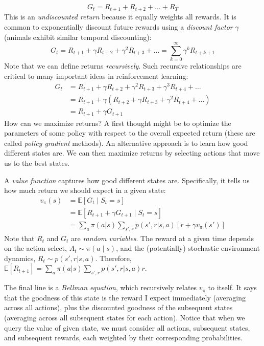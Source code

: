 $$ G_t = R_{t+1} + R_{t+2} + \dots + R_{T}$$
This is an \textit{undiscounted return} because it equally weights all rewards. It is common to exponentially discount future rewards using a \textit{discount factor} $\gamma$ (animals exhibit similar temporal discounting):
$$
G_t = R_{t+1} + \gamma R_{t+2} + \gamma^2R_{t+3} + \dots =
\sum_{k=0}^\infty \gamma^k R_{t+k+1}
$$
Note that we can define returns \textit{recursively}. Such recursive relationships are critical to many important ideas in reinforcement learning:
\begin{align*}
G_t &= R_{t+1} + \gamma R_{t+2} + \gamma^2R_{t+3} + \gamma^3R_{t+4} + \dots \\
&= R_{t+1} + \gamma(R_{t+2} + \gamma R_{t+3} + \gamma^2R_{t+4} +\dots) \\
&= R_{t+1} + \gamma G_{t+1}
\end{align*}
How can we maximize returns? A first thought might be to optimize the parameters of some policy with respect to the overall expected return (these are called \textit{policy gradient} methods). An alternative approach is to learn how good different states are. We can then maximize returns by selecting actions that move us to the best states.

A \textit{value function} captures how good different states are. Specifically, it tells us how much return we should expect in a given state:
\begin{align*}
v_\pi (s) &= \mathbb{E}[G_t \mid S_t=s] \\
&= \mathbb{E}[R_{t+1} + \gamma G_{t+1} \mid S_t=s] \\
&= \sum_a \pi (a|s) \sum_{s', r} p(s', r | s, a) [r + \gamma v_\pi (s')]
\end{align*}
Note that $R_t$ and $G_t$ are \textit{random variables}. The reward at a given time depends on the action select, $A_t \sim \pi (a \mid s)$, and the (potentially) stochastic environment dynamics, $R_t \sim p(s',r|s,a)$. Therefore, $\mathbb{E}[R_{t+1}] = \sum_a \pi (a|s) \sum_{s', r} p(s', r | s, a)r$.

The final line is a \textit{Bellman equation}, which recursively relates $v_\pi$ to itself. It says that the goodness of this state is the reward I expect immediately (averaging across all actions), plus the discounted goodness of the subsequent states (averaging across all subsequent states for each action). Notice that when we query the value of given state, we must consider all actions, subsequent states, and subsequent rewards, each weighted by their corresponding probabilities.

